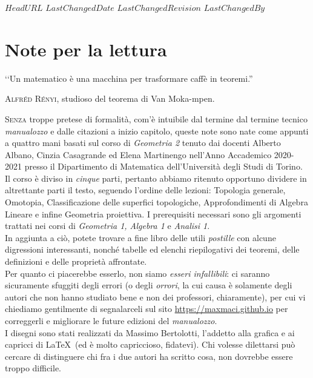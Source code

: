 \svnidlong
{$HeadURL$}
{$LastChangedDate$}
{$LastChangedRevision$}
{$LastChangedBy$}

\chapter*{Note per la lettura}

\begin{introduction}
‘‘Un matematico è una macchina per trasformare caffè in teoremi.''
\begin{flushright}
	\textsc{Alfréd Rényi,} studioso del teorema di Van Moka-mpen.
\end{flushright}
\end{introduction}

\lettrine[findent=1pt, nindent=0pt]{S}{enza} troppe pretese di formalità, com'è intuibile dal termine dal termine tecnico \textit{manualozzo} e dalle citazioni a inizio capitolo, queste note sono nate come appunti a quattro mani basati sul corso di \textit{Geometria 2} tenuto dai docenti Alberto Albano, Cinzia Casagrande ed Elena Martinengo nell'Anno Accademico 2020-2021 presso il Dipartimento di Matematica dell'Università degli Studi di Torino.\\
Il corso è diviso in \textit{cinque} parti, pertanto abbiamo ritenuto opportuno dividere in altrettante parti il testo, seguendo l'ordine delle lezioni: Topologia generale, Omotopia, Classificazione delle superfici topologiche, Approfondimenti di Algebra Lineare e infine Geometria proiettiva. I prerequisiti necessari sono gli argomenti trattati nei corsi di \textit{Geometria 1, Algebra 1} e \textit{Analisi 1}.\\
In aggiunta a ciò, potete trovare a fine libro delle utili \textit{postille} con alcune digressioni interessanti, nonché tabelle ed elenchi riepilogativi dei teoremi, delle definizioni e delle proprietà affrontate.\\
Per quanto ci piacerebbe esserlo, non siamo \textit{esseri infallibili}: ci saranno sicuramente sfuggiti degli errori (o degli \textit{orrori}, la cui causa è solamente degli autori che non hanno studiato bene e non dei professori, chiaramente), per cui vi chiediamo gentilmente di segnalarceli sul sito \textcolor{redill}{\url{https://maxmaci.github.io}} per correggerli e migliorare le future edizioni del \textit{manualozzo}.\\
I disegni sono stati realizzati da Massimo Bertolotti, l'addetto alla grafica e ai capricci di \LaTeX\ (ed è molto capriccioso, fidatevi). Chi volesse dilettarsi può cercare di distinguere chi fra i due autori ha scritto cosa, non dovrebbe essere troppo difficile.
